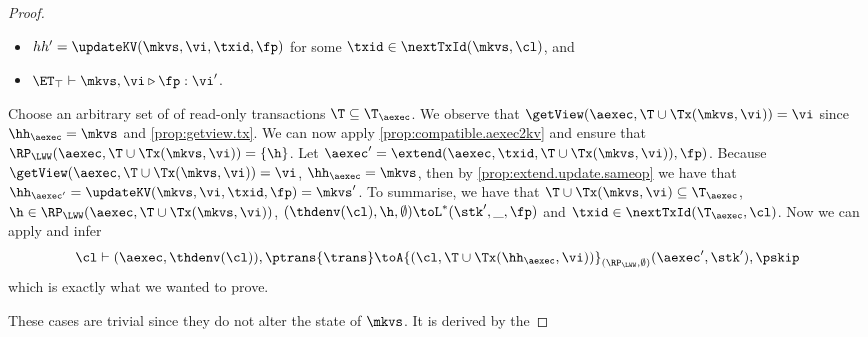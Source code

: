 \begin{proof}
\begin{itemize}
\item $hh' = \updateKV(\mkvs, \vi, \txid, \fp)$ for some $\txid \in \nextTxId(\mkvs, \cl)$, and
\item $\ET_{\top} \vdash \mkvs, \vi \triangleright \fp: \vi'$.
\end{itemize}
Choose an arbitrary set of of read-only transactions $\T \subseteq \T_{\aexec}$.
We observe that $\getView(\aexec, \T \cup \Tx(\mkvs, \vi)) = \vi$ since $\hh_{\aexec} = \mkvs$ and \cref{prop:getview.tx}.
We can now apply \cref{prop:compatible.aexec2kv} and ensure that $\RP_{\LWW}(\aexec, \T \cup \Tx(\mkvs, \vi)) = \{\h\}$.
Let $\aexec' = \extend(\aexec, \txid, \T \cup \Tx(\mkvs, \vi)), \fp)$. 
Because $\getView(\aexec, \T \cup \Tx(\mkvs, \vi)) = \vi$, $\hh_{\aexec} = \mkvs$,
then by \cref{prop:extend.update.sameop} we have that $\hh_{\aexec'} = \updateKV(\mkvs, \vi, \txid, \fp) = \mkvs'$. 
To summarise, we have that $\T \cup \Tx(\mkvs, \vi) \subseteq \T_{\aexec}$, $\h \in \RP_{\LWW}(\aexec, \T \cup \Tx(\mkvs, \vi))$,
$(\thdenv(\cl), \h, \emptyset) \toL^{\ast} (\stk', \_, \fp)$ and $\txid \in \nextTxId(\T_{\aexec}, \cl)$. 
Now we can apply  and infer
\[
\cl \vdash (\aexec, \thdenv(\cl)), \ptrans{\trans} \toA{(\cl, \T \cup \Tx(\hh_{\aexec}, \vi))}_{(\RP_{\LWW}, \emptyset)} 
(\aexec', \stk'), \pskip
\]
which is exactly what we wanted to prove. 

These cases are trivial since they do not alter the state of \( \mkvs \).
It is derived by the \ih
\end{proof}

